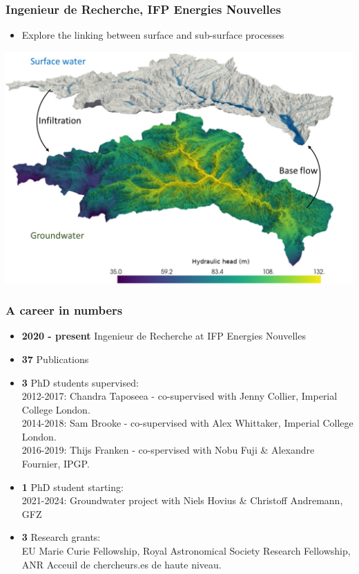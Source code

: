 \documentclass[aspectratio=169]{beamer}
\begin{document}
\begin{frame}
    \frametitle{Ingenieur de Recherche, IFP Energies Nouvelles}
    \begin{itemize}
        \item{Explore the linking between surface and sub-surface processes}
    \end{itemize}
    \centering
    \includegraphics[width=0.6\paperwidth]{./pictures/graphic1.png}
\end{frame}

\begin{frame}
    \frametitle{A career in numbers}
    \begin{itemize}
        \item{{\bf 2020 - present} Ingenieur de Recherche at IFP Energies Nouvelles}
        \item{{\bf37} Publications}
        \item{{\bf3} PhD students supervised: \\
              2012-2017: Chandra Taposeea - co-supervised with Jenny Collier, Imperial College London. \\
              2014-2018: Sam Brooke - co-supervised with Alex Whittaker, Imperial College London. \\
              2016-2019: Thijs Franken - co-spervised with Nobu Fuji \& Alexandre Fournier, IPGP.}
        \item{{\bf1} PhD student starting: \\
              2021-2024: Groundwater project with Niels Hovius \& Christoff Andremann, GFZ}
        \item{{\bf3} Research grants: \\
              EU Marie Curie Fellowship, Royal Astronomical Society Research Fellowship, ANR Acceuil de chercheurs.es de haute niveau.}
    \end{itemize}
\end{frame}
\end{document}

